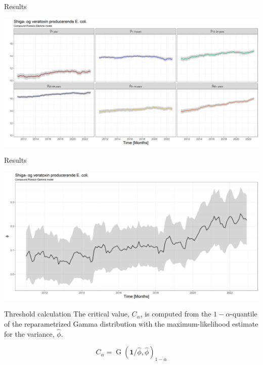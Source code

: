\documentclass[aspectratio=169]{beamer}
\DeclareMathOperator{\G}{G}
\begin{document}
\begin{frame}{Results}
\protect\hypertarget{results-2}{}
\tiny

\includegraphics[width=1\linewidth]{../figures/thetaSTECPoisGExclude}

\normalsize
\end{frame}

\begin{frame}{Results}
\protect\hypertarget{results-3}{}
\tiny

\includegraphics[width=1\linewidth]{../figures/phiSTECPoisGExclude}

\normalsize
\end{frame}

\begin{frame}{Threshold calculation}
\protect\hypertarget{threshold-calculation-1}{}
The critical value, \(C_\alpha\), is computed from the
\(1-\alpha\)-quantile of the reparametrized Gamma distribution with the
maximum-likelihood estimate for the variance, \(\hat\phi\).

\begin{equation}
  C_\alpha=\G(\boldsymbol{1}/\hat\phi,\hat\phi)_{1-\alpha}
\end{equation}
\end{frame}
\end{document}
